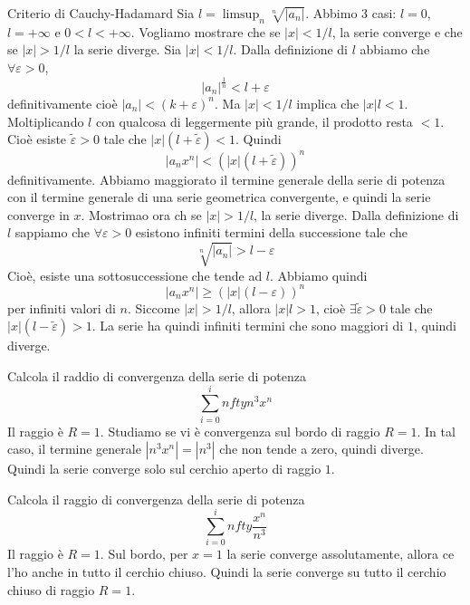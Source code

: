 \documentclass[a4paper]{article}
\begin{document}
\begin{snippetproof}{Criterio di Cauchy-Hadamard}
    Sia \(l = \limsup_n \sqrt[n]{|a_n|}\).
    Abbimo 3 casi: \(l = 0\), \(l = +\infty\) e \(0 < l < +\infty\).
    Vogliamo mostrare che se \(|x| < 1/l\),
    la serie converge e che se \(|x| > 1/l\) la serie diverge.
    Sia \(|x| < 1/l\).
    Dalla definizione di \(l\) abbiamo che \(\forall \varepsilon > 0\),
    \[
        |a_n|^{\frac1n} < l+\varepsilon
    \]
    definitivamente cioè \(|a_n| < (k+\varepsilon)^n\).
    Ma \(|x| < 1/l\) implica che \(|x|l < 1\).
    Moltiplicando \(l\) con qualcosa di leggermente più grande, il prodotto resta
    \(< 1\). Cioè esiste \(\tilde \varepsilon > 0\)
    tale che \(|x|(l + \tilde \varepsilon) < 1\).
    Quindi \[
        |a_nx^n| < (|x|(l + \tilde \varepsilon))^n
    \]
    definitivamente. Abbiamo maggiorato il termine generale della serie di potenza
    con il termine generale di una serie geometrica convergente, e quindi la serie converge in \(x\).
    Mostrimao ora ch se \(|x| > 1/l\), la serie diverge.
    Dalla definizione di \(l\) sappiamo che \(\forall \varepsilon > 0\)
    esistono infiniti termini della successione tale che
    \[
        \sqrt[n]{|a_n|} > l-\varepsilon
    \]
    Cioè, esiste una sottosuccessione che tende ad \(l\).
    Abbiamo quindi
    \[
        |a_nx^n| \geq (|x|(l - \varepsilon))^n
    \]
    per infiniti valori di \(n\).
    Siccome \(|x|>1/l\), allora \(|x|l>1\), cioè \(\exists \tilde \varepsilon > 0\)
    tale che \(|x|(l-\tilde \varepsilon) > 1\).
    La serie ha quindi infiniti termini che sono maggiori di \(1\), quindi diverge.
\end{snippetproof}

\begin{snippetexample}{}
    Calcola il raddio di convergenza della serie di potenza
    \[
        \sum_{i=0}^infty n^3 x^n
    \]
    Il raggio è \(R = 1\).
    Studiamo se vi è convergenza sul bordo di raggio \(R = 1\).
    In tal caso, il termine generale \(|n^3 x^n| = |n^3|\) che non tende a zero,
    quindi diverge.
    Quindi la serie converge solo sul cerchio aperto di raggio \(1\).
\end{snippetexample}

\begin{snippetexample}{}
    Calcola il raggio di convergenza della serie di potenza
    \[
        \sum_{i=0}^infty \frac{x^n}{n^3}
    \]
    Il raggio è \(R = 1\).
    Sul bordo, per \(x=1\) la serie converge assolutamente,
    allora ce l'ho anche in tutto il cerchio chiuso.
    Quindi la serie converge su tutto il cerchio chiuso di raggio \(R=1\).
\end{snippetexample}
\end{document}
